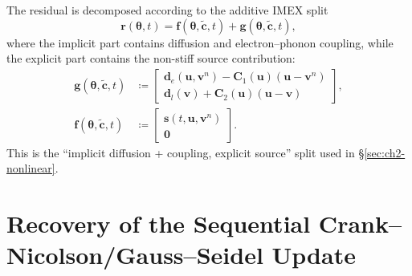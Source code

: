 The residual is decomposed according to the additive IMEX split
\begin{equation}
    \mathbf{r}(\boldsymbol{\theta},t)
    =
    \mathbf{f}(\boldsymbol{\theta},\tilde{\mathbf{c}},t)
    +
    \mathbf{g}(\boldsymbol{\theta},\tilde{\mathbf{c}},t),
    \label{eq:app-imex-split}
\end{equation}
where the implicit part contains diffusion and electron--phonon coupling, while the explicit part contains the non-stiff source contribution:
\begin{align}
    \mathbf{g}(\boldsymbol{\theta},\tilde{\mathbf{c}},t)
     & \coloneqq
    \begin{bmatrix}
        \mathbf{d}_e(\mathbf{u},\mathbf{v}^{n}) - \mathbf{C}_1(\mathbf{u})(\mathbf{u}-\mathbf{v}^{n}) \\
        \mathbf{d}_l(\mathbf{v}) + \mathbf{C}_2(\mathbf{u})(\mathbf{u}-\mathbf{v})
    \end{bmatrix},
    \label{eq:app-imex-g-def} \\
    \mathbf{f}(\boldsymbol{\theta},\tilde{\mathbf{c}},t)
     & \coloneqq
    \begin{bmatrix}
        \mathbf{s}(t,\mathbf{u},\mathbf{v}^{n}) \\
        \mathbf{0}
    \end{bmatrix}.
    \label{eq:app-imex-f-def}
\end{align}
This is the ``implicit diffusion + coupling, explicit source'' split used in \S\ref{sec:ch2-nonlinear}.

\section{Recovery of the Sequential Crank--Nicolson/Gauss--Seidel Update}

